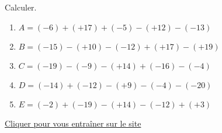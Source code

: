 \begin{exercice*}
    Calculer.
        \begin{enumerate}            
            \item $ A =  (-6)+(+17)+(-5)-(+12)-(-13) $
            \item $ B =  (-15)-(+10)-(-12)+(+17)-(+19) $
            \item $ C =  (-19)-(-9)-(+14)+(-16)-(-4) $
            \item $ D =  (-14)+(-12)-(+9)-(-4)-(-20) $
            \item $ E =  (-2)+(-19)-(+14)-(-12)+(+3) $
        \end{enumerate}

    \href{https://coopmaths.fr/mathalea.html?ex=5R22,s=20,s2=false,n=5,i=1&v=l}{Cliquer pour vous entraîner sur le site \mathaleaLogo} 
\end{exercice*}
